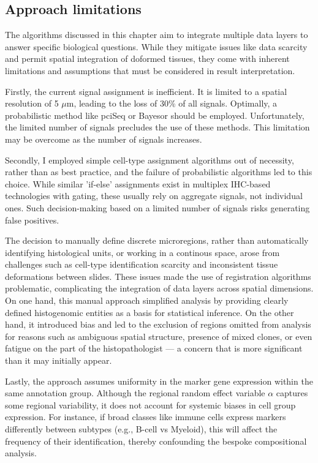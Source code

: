 \subsection{Approach limitations}

The algorithms discussed in this chapter aim to integrate multiple data layers to answer specific biological questions. While they mitigate issues like data scarcity and permit spatial integration of doformed tissues, they come with inherent limitations and assumptions that must be considered in result interpretation.

Firstly, the current signal assignment is inefficient. It is limited to a spatial resolution of 5 $\mu$m, leading to the loss of 30\% of all signals. Optimally, a probabilistic method like pciSeq \parencite{Qian2020-mp} or Bayesor \parencite{Petukhov2022-pv} should be employed. Unfortunately, the limited number of signals precludes the use of these methods. This limitation may be overcome as the number of signals increases.

Secondly, I employed simple cell-type assignment algorithms out of necessity, rather than as best practice, and the failure of probabilistic algorithms led to this choice. While similar 'if-else' assignments exist in multiplex \ac{IHC}-based technologies with gating, these usually rely on aggregate signals, not individual ones. Such decision-making based on a limited number of signals risks generating false positives.

The decision to manually define discrete microregions, rather than automatically identifying histological units, or working in a continous space, arose from challenges such as cell-type identification scarcity and inconsistent tissue deformations between slides. These issues made the use of registration algorithms problematic, complicating the integration of data layers across spatial dimensions. On one hand, this manual approach simplified analysis by providing clearly defined histogenomic entities as a basis for statistical inference. On the other hand, it introduced bias and led to the exclusion of regions omitted from analysis for reasons such as ambiguous spatial structure, presence of mixed clones, or even fatigue on the part of the histopathologist — a concern that is more significant than it may initially appear.

Lastly, the approach assumes uniformity in the marker gene expression within the same annotation group. Although the regional random effect variable $\alpha$ captures some regional variability, it does not account for systemic biases in cell group expression. For instance, if broad classes like immune cells express markers differently between subtypes (e.g., B-cell vs Myeloid), this will affect the frequency of their identification, thereby confounding the bespoke compositional analysis.

